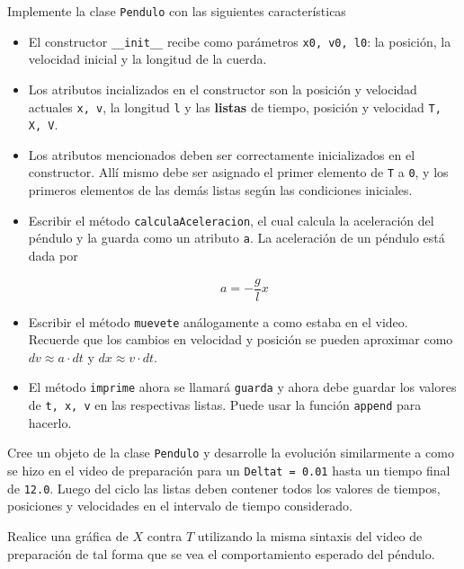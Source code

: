 \documentclass[11pt,letterpaper]{exam}
\begin{document}
\begin{questions}
 

Implemente la clase \verb"Pendulo" con las siguientes caracter\'isticas

\begin{itemize}
\item El constructor \verb'__init__' recibe como par\'ametros \verb'x0, v0, l0': la posici\'on, la velocidad inicial y la longitud de la cuerda.

\item Los atributos incializados en el constructor son la posici\'on y velocidad actuales \verb'x, v', la longitud \verb'l' y las \textbf{listas} de tiempo, posici\'on y velocidad \verb'T, X, V'.

\item Los atributos mencionados deben ser correctamente inicializados en el constructor. All\'i mismo debe ser asignado el primer elemento de \verb'T' a \verb'0', y los primeros elementos de las dem\'as listas seg\'un las condiciones iniciales.

\item Escribir el m\'etodo \verb'calculaAceleracion', el cual calcula la aceleraci\'on del p\'endulo y la guarda como un atributo \verb'a'. La aceleraci\'on de un p\'endulo est\'a dada por 

$$ a = - \frac{g}{l} x $$


\item Escribir el m\'etodo \verb'muevete' an\'alogamente a como estaba en el video. Recuerde que los cambios en velocidad y posici\'on se pueden aproximar como $dv \approx a\cdot dt$ y $dx \approx v\cdot dt$.

\item El m\'etodo \verb'imprime' ahora se llamar\'a \verb'guarda' y ahora debe guardar los valores de \verb't, x, v' en las respectivas listas. Puede usar la funci\'on \verb'append' para hacerlo.

\end{itemize}

Cree un objeto de la clase \verb'Pendulo' y desarrolle la evoluci\'on similarmente a como se hizo en el video de preparaci\'on para un \verb'Deltat = 0.01' hasta un tiempo final de \verb'12.0'. Luego del ciclo las listas deben contener todos los valores de tiempos, posiciones y velocidades en el intervalo de tiempo considerado.


Realice una gr\'afica de $X$ contra $T$ utilizando la misma sintaxis del video de preparaci\'on de tal forma que se vea el comportamiento esperado del p\'endulo.

\end{questions}
\end{document}
